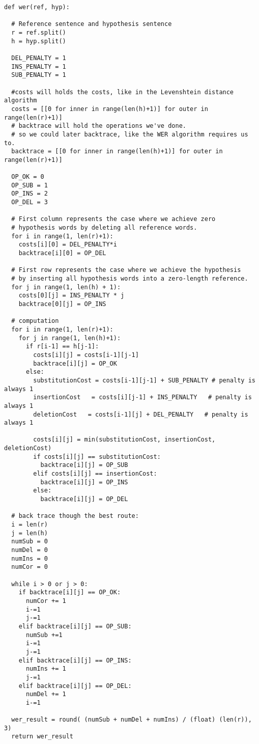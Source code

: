 \begin{lstlisting}
def wer(ref, hyp):

  # Reference sentence and hypothesis sentence
  r = ref.split()
  h = hyp.split()

  DEL_PENALTY = 1
  INS_PENALTY = 1
  SUB_PENALTY = 1

  #costs will holds the costs, like in the Levenshtein distance algorithm
  costs = [[0 for inner in range(len(h)+1)] for outer in range(len(r)+1)]
  # backtrace will hold the operations we've done.
  # so we could later backtrace, like the WER algorithm requires us to.
  backtrace = [[0 for inner in range(len(h)+1)] for outer in range(len(r)+1)]

  OP_OK = 0
  OP_SUB = 1
  OP_INS = 2
  OP_DEL = 3

  # First column represents the case where we achieve zero
  # hypothesis words by deleting all reference words.
  for i in range(1, len(r)+1):
    costs[i][0] = DEL_PENALTY*i
    backtrace[i][0] = OP_DEL

  # First row represents the case where we achieve the hypothesis
  # by inserting all hypothesis words into a zero-length reference.
  for j in range(1, len(h) + 1):
    costs[0][j] = INS_PENALTY * j
    backtrace[0][j] = OP_INS

  # computation
  for i in range(1, len(r)+1):
    for j in range(1, len(h)+1):
      if r[i-1] == h[j-1]:
        costs[i][j] = costs[i-1][j-1]
        backtrace[i][j] = OP_OK
      else:
        substitutionCost = costs[i-1][j-1] + SUB_PENALTY # penalty is always 1
        insertionCost   = costs[i][j-1] + INS_PENALTY   # penalty is always 1
        deletionCost   = costs[i-1][j] + DEL_PENALTY   # penalty is always 1

        costs[i][j] = min(substitutionCost, insertionCost, deletionCost)
        if costs[i][j] == substitutionCost:
          backtrace[i][j] = OP_SUB
        elif costs[i][j] == insertionCost:
          backtrace[i][j] = OP_INS
        else:
          backtrace[i][j] = OP_DEL

  # back trace though the best route:
  i = len(r)
  j = len(h)
  numSub = 0
  numDel = 0
  numIns = 0
  numCor = 0

  while i > 0 or j > 0:
    if backtrace[i][j] == OP_OK:
      numCor += 1
      i-=1
      j-=1
    elif backtrace[i][j] == OP_SUB:
      numSub +=1
      i-=1
      j-=1
    elif backtrace[i][j] == OP_INS:
      numIns += 1
      j-=1
    elif backtrace[i][j] == OP_DEL:
      numDel += 1
      i-=1

  wer_result = round( (numSub + numDel + numIns) / (float) (len(r)), 3)
  return wer_result

\end{lstlisting}


